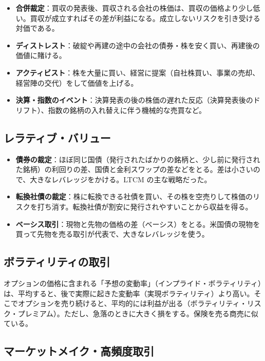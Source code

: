 \begin{itemize}
\item \textbf{合併裁定}：買収の発表後、買収される会社の株価は、買収の価格より少し低い。買収が成立すればその差が利益になる。成立しないリスクを引き受ける対価である。
\item \textbf{ディストレスト}：破綻や再建の途中の会社の債券・株を安く買い、再建後の価値に賭ける。
\item \textbf{アクティビスト}：株を大量に買い、経営に提案（自社株買い、事業の売却、経営陣の交代）をして価値を上げる。
\item \textbf{決算・指数のイベント}：決算発表の後の株価の遅れた反応（決算発表後のドリフト）、指数の銘柄の入れ替えに伴う機械的な売買など。
\end{itemize}

\subsection{レラティブ・バリュー}

\begin{itemize}
\item \textbf{債券の裁定}：ほぼ同じ国債（発行されたばかりの銘柄と、少し前に発行された銘柄）の利回りの差、国債と金利スワップの差などをとる。差は小さいので、大きなレバレッジをかける。LTCM の主な戦略だった。
\item \textbf{転換社債の裁定}：株に転換できる社債を買い、その株を空売りして株価のリスクを打ち消す。転換社債が割安に発行されやすいことから収益を得る。
\item \textbf{ベーシス取引}：現物と先物の価格の差（ベーシス）をとる。米国債の現物を買って先物を売る取引が代表で、大きなレバレッジを使う。
\end{itemize}

\subsection{ボラティリティの取引}

オプションの価格に含まれる「予想の変動率」（インプライド・ボラティリティ）は、平均すると、後で実際に起きた変動率（実現ボラティリティ）より高い。そこでオプションを売り続けると、平均的には利益が出る（ボラティリティ・リスク・プレミアム）。ただし、急落のときに大きく損をする。保険を売る商売に似ている。

\subsection{マーケットメイク・高頻度取引}

